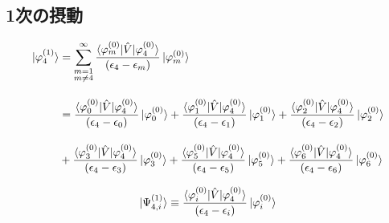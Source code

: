 \subsection*{1次の摂動}
\begin{align}
    \ket{\varphi_{4}^{(1)}}
    &=
    \displaystyle\sum_{\substack{m=1 \\ m\neq 4}}^\infty
     \frac{\braket{\varphi_{m
     }^{(0)}|\hat{V}|\varphi_{4}^{(0)}}}{(\epsilon_{4}-\epsilon_{m})}\ket{\varphi_{m}^{(0)}}\nn[10pt]
     &=\frac{\braket{\varphi_{0
     }^{(0)}|\hat{V}|\varphi_{4}^{(0)}}}{(\epsilon_{4}-\epsilon_{0})}\ket{\varphi_{0}^{(0)}}
     +
     \frac{\braket{\varphi_{1
     }^{(0)}|\hat{V}|\varphi_{4}^{(0)}}}{(\epsilon_{4}-\epsilon_{1})}\ket{\varphi_{1}^{(0)}}
     +
     \frac{\braket{\varphi_{2
     }^{(0)}|\hat{V}|\varphi_{4}^{(0)}}}{(\epsilon_{4}-\epsilon_{2})}\ket{\varphi_{2}^{(0)}}
     \nn[10pt]
     &+
     \frac{\braket{\varphi_{3
     }^{(0)}|\hat{V}|\varphi_{4}^{(0)}}}{(\epsilon_{4}-\epsilon_{3})}\ket{\varphi_{3}^{(0)}}
     +
     \frac{\braket{\varphi_{5
     }^{(0)}|\hat{V}|\varphi_{4}^{(0)}}}{(\epsilon_{4}-\epsilon_{5})}\ket{\varphi_{5}^{(0)}}
     +
     \frac{\braket{\varphi_{6
     }^{(0)}|\hat{V}|\varphi_{4}^{(0)}}}{(\epsilon_{4}-\epsilon_{6})}\ket{\varphi_{6}^{(0)}}
\end{align}


\begin{equation}
    \ket{\Psi_{4,i}^{(1)}}
    \equiv 
    \frac{\braket{\varphi_{i
     }^{(0)}|\hat{V}|\varphi_{4}^{(0)}}}{(\epsilon_{4}-\epsilon_{i})}\ket{\varphi_{i}^{(0)}}
\end{equation}




